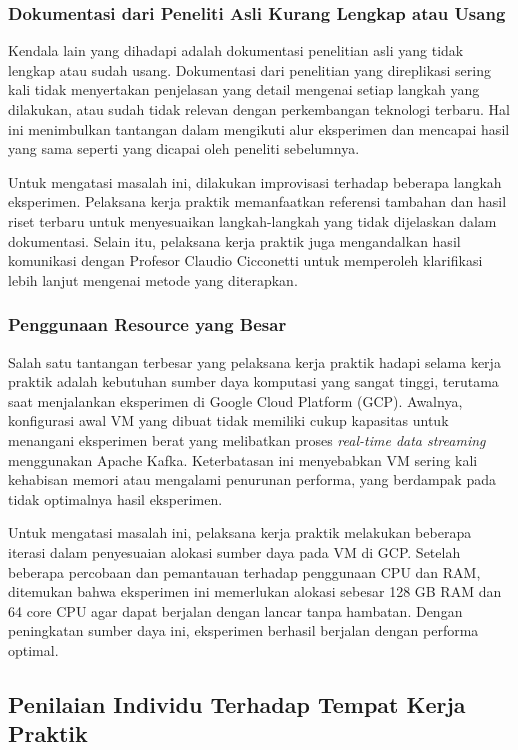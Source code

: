 \subsubsection{Dokumentasi dari Peneliti Asli Kurang Lengkap atau Usang}

Kendala lain yang dihadapi adalah dokumentasi penelitian asli yang tidak lengkap atau sudah usang. Dokumentasi dari penelitian yang direplikasi sering kali tidak menyertakan penjelasan yang detail mengenai setiap langkah yang dilakukan, atau sudah tidak relevan dengan perkembangan teknologi terbaru. Hal ini menimbulkan tantangan dalam mengikuti alur eksperimen dan mencapai hasil yang sama seperti yang dicapai oleh peneliti sebelumnya.

Untuk mengatasi masalah ini, dilakukan improvisasi terhadap beberapa langkah eksperimen. Pelaksana kerja praktik memanfaatkan referensi tambahan dan hasil riset terbaru untuk menyesuaikan langkah-langkah yang tidak dijelaskan dalam dokumentasi. Selain itu, pelaksana kerja praktik juga mengandalkan hasil komunikasi dengan Profesor Claudio Cicconetti untuk memperoleh klarifikasi lebih lanjut mengenai metode yang diterapkan.

\subsubsection{Penggunaan Resource yang Besar}

Salah satu tantangan terbesar yang pelaksana kerja praktik hadapi selama kerja praktik adalah kebutuhan sumber daya komputasi yang sangat tinggi, terutama saat menjalankan eksperimen di Google Cloud Platform (GCP). Awalnya, konfigurasi awal VM yang dibuat tidak memiliki cukup kapasitas untuk menangani eksperimen berat yang melibatkan proses \textit{real-time data streaming} menggunakan Apache Kafka. Keterbatasan ini menyebabkan VM sering kali kehabisan memori atau mengalami penurunan performa, yang berdampak pada tidak optimalnya hasil eksperimen.

Untuk mengatasi masalah ini, pelaksana kerja praktik melakukan beberapa iterasi dalam penyesuaian alokasi sumber daya pada VM di GCP. Setelah beberapa percobaan dan pemantauan terhadap penggunaan CPU dan RAM, ditemukan bahwa eksperimen ini memerlukan alokasi sebesar 128 GB RAM dan 64 core CPU agar dapat berjalan dengan lancar tanpa hambatan. Dengan peningkatan sumber daya ini, eksperimen berhasil berjalan dengan performa optimal.

\subsection{Penilaian Individu Terhadap Tempat Kerja Praktik}

